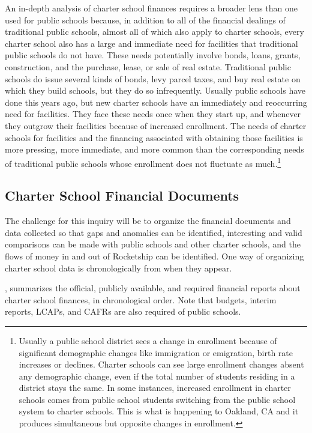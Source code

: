 An in-depth analysis of charter school finances requires a broader lens than one used for public schools because, in addition to all of the financial dealings of traditional public schools, almost all of which also apply to charter schools, every charter school also has a large and immediate need for facilities that traditional public schools do not have. These needs potentially involve  bonds, loans, grants, construction, and the purchase, lease, or sale of real estate. Traditional public schools do issue several kinds of bonds, levy parcel taxes, and buy real estate on which they build schools, but they do so infrequently. Usually public schools have done this years ago, but new charter schools have an immediately and reoccurring need for facilities. They face these needs once when they start up, and whenever they outgrow their facilities because of increased enrollment. The needs of charter schools for facilities and the financing associated with obtaining those facilities is more pressing, more immediate, and more common than the corresponding needs of traditional public schools whose enrollment does not fluctuate as much.\footnote{Usually a public school district sees a change in enrollment because of significant demographic changes like immigration or emigration, birth rate increases or declines. Charter schools can see large enrollment changes absent any demographic change, even if the total number of students residing in a district stays the same. In some instances, increased enrollment in charter schools comes from public school students switching from the public school system to charter schools. This is what is happening to Oakland, CA and it produces simultaneous but opposite changes in enrollment.}

\subsection{Charter School Financial Documents}\label{sec:charter-financial-docs}%

The challenge for this inquiry will be to organize the financial documents and data collected so that gaps and anomalies can be identified, interesting and valid comparisons can be made with public schools and other charter schools, and the flows of money in and out of Rocketship can be identified. One way of organizing charter school data is chronologically from when they appear.

, summarizes the official, publicly available, and required financial reports about charter school finances, in chronological order. Note that budgets, interim reports, LCAPs, and CAFRs are also required of public schools. 

